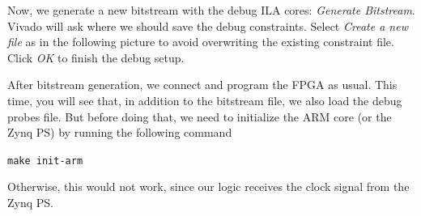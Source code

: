 \documentclass[11pt]{article}
\begin{document}
\begin{center}
\end{center}
Now, we generate a new bitstream with the debug ILA cores: \emph{Generate Bitstream}. Vivado will ask where we should save the debug constraints. Select \emph{Create a new file} as in the following picture to avoid overwriting the existing constraint file. Click \emph{OK} to finish the debug setup. 

\begin{center}
\end{center}

After bitstream generation, we connect and program the FPGA as usual. This time, you will see that, in addition to the bitstream file, we also load the debug probes file. But before doing that, we need to initialize the ARM core (or the Zynq PS) by running the following command

\texttt{make init-arm}

Otherwise, this would not work, since our logic receives the clock signal from the Zynq PS.

\begin{center}
\end{center}
\end{document}
